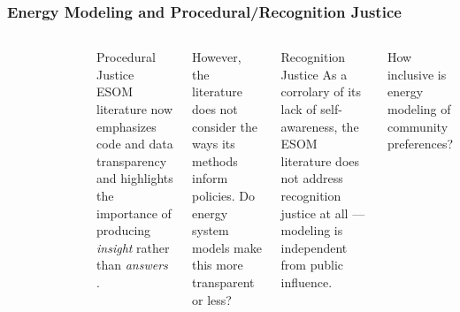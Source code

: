 \begin{frame}
    \frametitle{Energy Modeling and Procedural/Recognition Justice}
    \begin{columns}
        \column[t]{3cm}
        \begin{figure}
            \centering
        \end{figure}
        \column[t]{7cm}
        \begin{block}{Procedural Justice}
            ESOM literature now emphasizes code and data transparency
            \cite{decarolis_formalizing_2017} and highlights the importance of
            producing \textit{insight} rather than \textit{answers}
            \cite{decarolis_using_2011}.
        \end{block}
        \begin{block}{}
            However, the literature does not consider the ways its methods
            inform policies. Do energy system models make this more transparent or less?
        \end{block}
        \begin{block}{Recognition Justice}
            As a corrolary of its lack of self-awareness, the ESOM literature
            does not address recognition justice at all --- modeling is
            independent from public influence.
        \end{block}
        \begin{block}{}
            How inclusive is energy modeling of community preferences?
        \end{block}
    \end{columns}
    
\end{frame}


